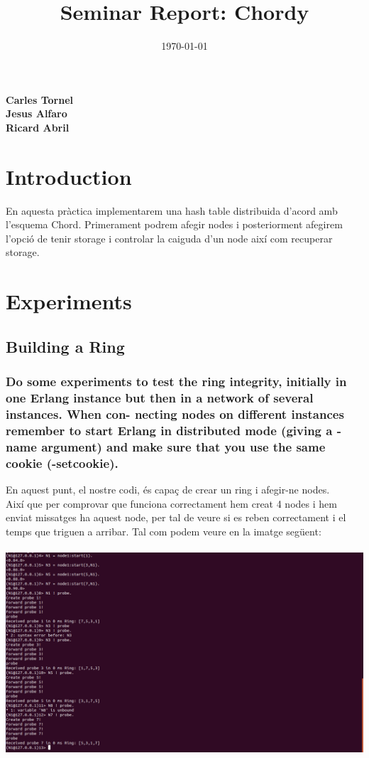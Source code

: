 \documentclass[a4paper, 10pt]{article}
\title{Seminar Report: Chordy}
\date{\normalsize\today{}}
\begin{document}
\author{}
\maketitle

\begin{center}
  \textbf{Carles Tornel}\\
  \textbf{Jesus Alfaro}\\
  \textbf{Ricard Abril}

\end{center}
\section{Introduction}
En aquesta pràctica implementarem una hash table distribuida d'acord amb l'esquema Chord. Primerament podrem afegir nodes i posteriorment afegirem l'opció de tenir storage i controlar la caiguda d'un node així com recuperar storage.

\newpage\section{Experiments}
\subsection{Building a Ring}
\subsubsection{Do some experiments to test the ring integrity, initially in one Erlang instance but then in a network of several instances. When con- necting nodes on different instances remember to start Erlang in distributed mode (giving a -name argument) and make sure that you use the same cookie (-setcookie).}
En aquest punt, el nostre codi, és capaç de crear un ring i afegir-ne nodes.\\ 
Així que per comprovar que funciona correctament hem creat 4 nodes i hem enviat missatges ha aquest node, per tal de veure si es reben correctament i el temps que triguen a arribar. Tal com podem veure en la imatge següent:\\\\
\includegraphics[width=\textwidth]{Ex1.png}
\newpage
\end{document}
